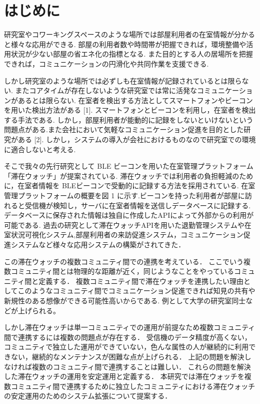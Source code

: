\thispagestyle{myheadings}

\section{はじめに}
\label{sec:intro}
研究室やコワーキングスペースのような場所では部屋利用者の在室情報が分かると様々な応用ができる.
部屋の利用者数や時間帯が把握できれば，環境整備や活用状況が少ない部屋の省エネ化の指標となる.
また目的とする人の居場所を把握できれば，コミュニケーションの円滑化や共同作業を支援できる.

しかし研究室のような場所では必ずしも在室情報が記録されているとは限らない.
またコアタイムが存在しないような研究室では常に活発なコミュニケーションがあるとは限らない.
在室者を検出する方法としてスマートフォンやビーコンを用いた検出方法がある [1].
スマートフォンとビーコンを利用し，在室者を検出する手法である.
しかし，部屋利用者が能動的に記録をしないといけないという問題点がある.また会社において気軽なコミュニケーション促進を目的とした研究がある [2].
しかし，システムの導入が会社におけるものなので研究室での環境に適合しないと考える.

そこで我々の先行研究として BLE ビーコンを用いた在室管理プラットフォーム「滞在ウォッチ」が提案されている.
滞在ウォッチでは利用者の負担軽減のために，在室者情報を BLEビーコンで受動的に記録する方法を採用されている.
在室管理プラットフォームの概要を図 1 に示す.ビーコンを持った利用者が部屋に訪れると受信機が検知し，サーバに在室者情報を送信しデータベースに記録する.
データベースに保存された情報は独自に作成したAPIによって外部からの利用が可能である.
過去の研究として滞在ウォッチAPIを用いた退勤管理システムや在室状況可視化システム,部屋利用者の来訪促進システム，コミュニケーション促進システムなど様々な応用システムの構築がされてきた．

この滞在ウォッチの複数コミュニティ間での連携を考えている．
ここでいう複数コミュニティ間とは物理的な距離が近く，同じようなことをやっているコミュニティ間と定義する．
複数コミュニティ間で滞在ウォッチを連携したい理由としてこのようなコミュニティ間でコミュニケーション促進できれば知見の共有や新規性のある想像ができる可能性高いからである.
例として大学の研究室同士などが上げられる。

しかし滞在ウォッチは単一コミュニティでの運用が前提なため複数コミュニティ間で連携するには複数の問題点が存在する．
受信機のデータ精度が高くない，コミュニティで独立した運用ができていない，色んな属性の人が継続的に利用できない，継続的なメンテナンスが困難な点が上げられる．
上記の問題を解決しなければ複数のコミュニティ間で連携することは難しい．
これらの問題を解決した滞在ウォッチの運用を安定運用と定義する．
本研究では滞在ウォッチを複数コミュニティ間で連携するために独立したコミュニティにおける滞在ウォッチの安定運用のためのシステム拡張について提案する．